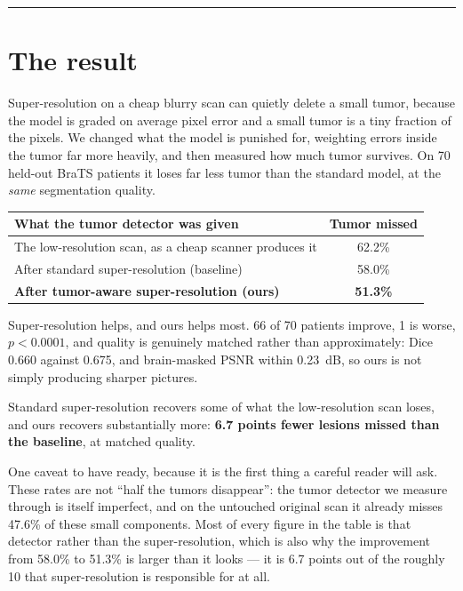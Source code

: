 \documentclass[11pt,a4paper]{article}
\newcommand{\thinrule}{\noindent\textcolor{rule}{\rule{\linewidth}{0.6pt}}}
\begin{document}
\vspace{0.3em}
\thinrule

\section*{The result}

Super-resolution on a cheap blurry scan can quietly delete a small tumor, because the model is
graded on average pixel error and a small tumor is a tiny fraction of the pixels. We changed
what the model is punished for, weighting errors inside the tumor far more heavily, and then
measured how much tumor survives. On 70 held-out BraTS patients it loses far less tumor than
the standard model, at the \emph{same} segmentation quality.

\begin{center}\small
\renewcommand{\arraystretch}{1.15}
\begin{tabular}{@{}>{\raggedright\arraybackslash}p{8.2cm}c@{}}
\toprule
\textbf{What the tumor detector was given} & \textbf{Tumor missed} \\
\midrule
The low-resolution scan, as a cheap scanner produces it & 62.2\% \\
After standard super-resolution (baseline)              & 58.0\% \\
\textbf{After tumor-aware super-resolution (ours)}      & \textbf{51.3\%} \\
\bottomrule
\end{tabular}
\end{center}

Super-resolution helps, and ours helps most. 66 of 70 patients improve, 1 is worse,
$p < 0.0001$, and quality is genuinely matched rather than approximately: Dice 0.660 against
0.675, and brain-masked PSNR within 0.23~dB, so ours is not simply producing sharper pictures.

Standard super-resolution recovers some of what the low-resolution scan loses, and ours
recovers substantially more: \textbf{6.7 points fewer lesions missed than the baseline}, at
matched quality.

One caveat to have ready, because it is the first thing a careful reader will ask. These rates
are not ``half the tumors disappear'': the tumor detector we measure through is itself
imperfect, and on the untouched original scan it already misses 47.6\% of these small
components. Most of every figure in the table is that detector rather than the
super-resolution, which is also why the improvement from 58.0\% to 51.3\% is larger than it
looks --- it is 6.7 points out of the roughly 10 that super-resolution is responsible for at
all.
\end{document}
